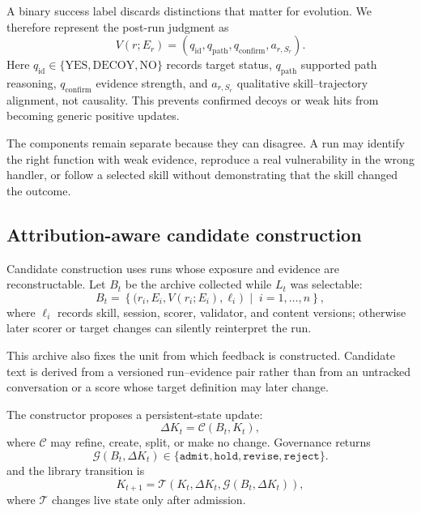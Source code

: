 \documentclass[11pt]{article}
\begin{document}
A binary success label discards distinctions that matter for evolution.  We therefore
represent the post-run judgment as
\begin{equation}
    V(r;E_r) = \left(q_{\mathrm{id}}, q_{\mathrm{path}},
    q_{\mathrm{confirm}}, a_{r,S_r}\right).
\end{equation}
Here $q_{\mathrm{id}}\in\{\mathrm{YES},\mathrm{DECOY},\mathrm{NO}\}$ records target
status, $q_{\mathrm{path}}$ supported path reasoning, $q_{\mathrm{confirm}}$ evidence
strength, and $a_{r,S_r}$ qualitative skill--trajectory alignment, not causality.  This
prevents confirmed decoys or weak hits from becoming generic positive updates.

The components remain separate because they can disagree.  A run may identify the right
function with weak evidence, reproduce a real vulnerability in the wrong handler, or
follow a selected skill without demonstrating that the skill changed the outcome.

\subsection{Attribution-aware candidate construction}

Candidate construction uses runs whose exposure and evidence are reconstructable.  Let
$B_t$ be the archive collected while $L_t$ was selectable:
\begin{equation}
    B_t = \left\{\bigl(r_i,E_i,V(r_i;E_i),\ell_i\bigr)
    \;\middle|\; i=1,\ldots,n\right\},
\end{equation}
where $\ell_i$ records skill, session, scorer, validator, and content versions; otherwise
later scorer or target changes can silently reinterpret the run.

This archive also fixes the unit from which feedback is constructed.  Candidate text is
derived from a versioned run--evidence pair rather than from an untracked conversation or
a score whose target definition may later change.

The constructor proposes a persistent-state update:
\begin{equation}
    \Delta K_t = \mathcal{C}(B_t, K_t),
\end{equation}
where $\mathcal{C}$ may refine, create, split, or make no change.  Governance returns
\begin{equation}
    \mathcal{G}(B_t, \Delta K_t)
    \in \{\texttt{admit}, \texttt{hold}, \texttt{revise}, \texttt{reject}\}.
\end{equation}
and the library transition is
\begin{equation}
    K_{t+1} = \mathcal{T}\!\left(K_t,\Delta K_t,
    \mathcal{G}(B_t,\Delta K_t)\right),
\end{equation}
where $\mathcal{T}$ changes live state only after admission.
\end{document}
